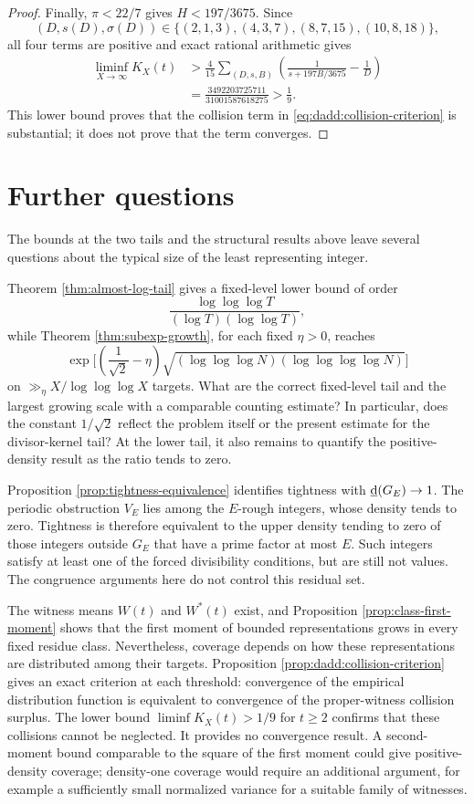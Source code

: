 \documentclass[11pt,letterpaper,reqno]{amsart}
\numberwithin{equation}{section}
\theoremstyle{remark}
\newcommand{\1}{\mathbf 1}
\newcommand{\lowerdens}{\underline{\textup{d}}}
\renewcommand{\geq}{\geqslant}
\begin{document}
\begin{proof}
Finally, $\pi<22/7$ gives $H<197/3675$. Since
\[
 (D,s(D),\sigma(D))
 \in\{(2,1,3),(4,3,7),(8,7,15),(10,8,18)\},
\]
all four terms are positive and exact rational arithmetic gives
\begin{align*}
 \liminf_{X\to\infty}K_X(t)
 &>
 \frac4{15}
 \sum_{(D,s,B)}
 \left(\frac1{s+197B/3675}-\frac1D\right)\\
 &=\frac{3492203725711}{31001587618275}
 >\frac19.
\end{align*}
This lower bound proves that the collision term in
\eqref{eq:dadd:collision-criterion} is substantial; it does not
prove that the term converges.
\end{proof}


\section{Further questions}

The bounds at the two tails and the structural results above leave several questions about the typical size of the least representing integer.

Theorem \ref{thm:almost-log-tail} gives a fixed-level lower bound of order
\[
 \frac{\log\log\log T}{(\log T)(\log\log T)},
\]
while Theorem \ref{thm:subexp-growth}, for each fixed $\eta>0$, reaches
\[
 \exp\biggl[\left(\frac1{\sqrt2}-\eta\right)
 \sqrt{(\log\log\log N)(\log\log\log\log N)}\biggr]
\]
on
$\gg_\eta X/\log\log\log X$ targets. What are the correct fixed-level tail and the
largest growing scale with a comparable counting estimate? In
particular, does the constant $1/\sqrt2$ reflect the problem itself or the
present estimate for the divisor-kernel tail? At the lower tail, it also
remains to quantify the positive-density result as the ratio tends to zero.

Proposition \ref{prop:tightness-equivalence} identifies tightness with
$\lowerdens(G_E)\to1$. The periodic obstruction $V_E$ lies among the
$E$-rough integers, whose density tends to zero. Tightness is therefore
equivalent to the upper density tending to zero of those integers outside
$G_E$ that have a prime factor at most $E$. Such integers satisfy at least
one of the forced divisibility conditions, but are still not values.
The congruence arguments here do not control this residual set.

The witness means $W(t)$ and $W^*(t)$ exist, and
Proposition \ref{prop:class-first-moment} shows that the first moment of
bounded representations grows in every fixed residue class. Nevertheless,
coverage depends on how these representations are distributed among their
targets. Proposition \ref{prop:dadd:collision-criterion} gives an exact
criterion at each threshold: convergence of the empirical distribution
function is equivalent to convergence of the proper-witness collision
surplus. The lower bound $\liminf K_X(t)>1/9$ for $t\geq2$ confirms that
these collisions cannot be neglected. It provides no convergence result.
A second-moment bound comparable to the square of the first moment could
give positive-density coverage; density-one coverage would require an
additional argument, for example a sufficiently small normalized variance
for a suitable family of witnesses.
\end{document}

